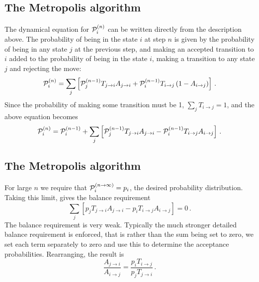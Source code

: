 \documentclass[%
twoside,                 %
final,                   %
10pt]{article}
\begin{document}
\subsection{The Metropolis algorithm}

\paragraph{}
The dynamical equation for ${\cal P}_i^{(n)}$ can be written directly from
the description above. The probability of being in the state $i$ at step $n$
is given by the probability of being in any state $j$ at the previous step,
and making an accepted transition to $i$ added to the probability of
being in the state $i$, making a transition to any state $j$ and
rejecting the move:
\[
{\cal P}^{(n)}_i = \sum_j \left [
{\cal P}^{(n-1)}_jT_{j\rightarrow i} A_{j\rightarrow i} 
+{\cal P}^{(n-1)}_iT_{i\rightarrow j}\left ( 1- A_{i\rightarrow j} \right)
\right ] \,.
\]
Since the probability of making some transition must be 1,
$\sum_j T_{i\rightarrow j} = 1$, and the above equation becomes
\[
{\cal P}^{(n)}_i = {\cal P}^{(n-1)}_i +
 \sum_j \left [
{\cal P}^{(n-1)}_jT_{j\rightarrow i} A_{j\rightarrow i} 
-{\cal P}^{(n-1)}_iT_{i\rightarrow j}A_{i\rightarrow j}
\right ] \,.
\]




\subsection{The Metropolis algorithm}

\paragraph{}
For large $n$ we require that ${\cal P}^{(n\rightarrow \infty)}_i = p_i$,
the desired probability distribution. Taking this limit, gives the
balance requirement
\[
 \sum_j \left [
p_jT_{j\rightarrow i} A_{j\rightarrow i}
-p_iT_{i\rightarrow j}A_{i\rightarrow j}
\right ] = 0 \,.
\]
The balance requirement is very weak. Typically the much stronger detailed
balance requirement is enforced, that is rather than the sum being
set to zero, we set each term separately to zero and use this
to determine the acceptance probabilities. Rearranging, the result is
\[
\frac{ A_{j\rightarrow i}}{A_{i\rightarrow j}}
= \frac{p_iT_{i\rightarrow j}}{ p_jT_{j\rightarrow i}} \,.
\]
\end{document}

